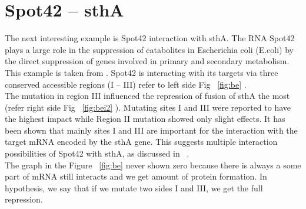 \documentclass[twoside,a4paper]{report}
\numberwithin{equation}{section}
\begin{document}
\clearpage
	
	
	
	\section{Spot42 – sthA }
	
	The next interesting example is Spot42 interaction with sthA. The RNA Spot42 plays a large role in the suppression of catabolites in Escherichia coli (E.coli) by the direct suppression of genes involved in primary and secondary metabolism.\\
	
	This example is taken from \citep{beisel2011base}. Spot42 is interacting with its targets via three conserved accessible regions (I – III) refer to left side Fig ~\ref{fig:be} . \\
	The mutation in region III influenced the repression of fusion of sthA the most (refer right side Fig ~\ref{fig:bei2} ). Mutating sites I and III were reported to have the highest impact while Region II mutation showed only slight effects. It has been shown that mainly sites I and III are important for the interaction with the target mRNA encoded by the sthA gene. This suggests multiple interaction possibilities of Spot42 with sthA, as discussed in  ~\citet{mann2017intarna}.\\
	
	 The graph in the Figure ~\ref{fig:be} never shown zero because there is always a some part of mRNA still interacts and we get amount of protein formation. In hypothesis, we say that if we mutate two sides I and III, we get the full repression.\\
	
	
	
\end{document}
